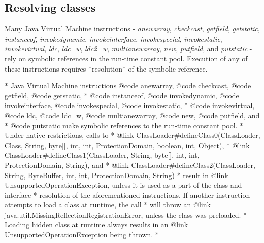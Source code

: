 \subsection{Resolving classes}
Many Java Virtual Machine instructions - \textit{anewarray}, \textit{checkcast}, \textit{getfield}, \textit{getstatic}, \textit{instanceof}, \textit{invokedynamic}, \textit{invokeinterface}, \textit{invokespecial}, \textit{invokestatic}, \textit{invokevirtual}, \textit{ldc}, \textit{ldc\_w}, \textit{ldc2\_w}, \textit{multianewarray}, \textit{new}, \textit{putfield}, and \textit{putstatic} - rely on symbolic references in the run-time constant pool. Execution of any of these instructions requires *resolution* of the symbolic reference. 


     * Java Virtual Machine instructions {@code anewarray}, {@code checkcast}, {@code getfield}, {@code getstatic},
     * {@code instanceof}, {@code invokedynamic}, {@code invokeinterface}, {@code invokespecial}, {@code invokestatic},
     * {@code invokevirtual}, {@code ldc}, {@code ldc_w}, {@code multianewarray}, {@code new}, {@code putfield}, and
     * {@code putstatic} make symbolic references to the run-time constant pool.
     * Under native restrictions, calls to
     * {@link ClassLoader#defineClass0(ClassLoader, Class, String, byte[], int, int, ProtectionDomain, boolean, int, Object)},
     * {@link ClassLoader#defineClass1(ClassLoader, String, byte[], int, int, ProtectionDomain, String)}, and
     * {@link ClassLoader#defineClass2(ClassLoader, String, ByteBuffer, int, int, ProtectionDomain, String)}
     * result in {@link UnsupportedOperationException}, unless it is used as a part of the class and interface
     * resolution of the aforementioned instructions. If another instruction attempts to load a class at runtime, the call
     * will throw an {@link java.util.MissingReflectionRegistrationError}, unless the class was preloaded.
     * Loading hidden class at runtime always results in an {@link UnsupportedOperationException} being thrown.
     *


